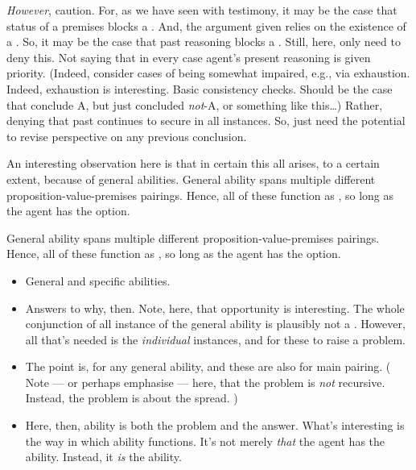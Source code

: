 \begin{note}
  \emph{However}, caution.
  For, as we have seen with testimony, it may be the case that status of a premises blocks a \requ{}.
  And, the argument given relies on the existence of a \requ{}.
  So, it may be the case that past reasoning blocks a \requ{}.
  Still, here, only need to deny this.
  Not saying that in every case agent's present reasoning is given priority.
  (Indeed, consider cases of being somewhat impaired, e.g., via exhaustion.
  Indeed, exhaustion is interesting.
  Basic consistency checks.
  Should be the case that conclude A, but just concluded \emph{not}-A, or something like this\dots)
  Rather, denying that past continues to secure in all instances.
  So, just need the potential to revise perspective on any previous conclusion.
\end{note}

\begin{note}
  An interesting observation here is that in certain this all arises, to a certain extent, because of general abilities.
  General ability spans multiple different proposition-value-premises pairings.
  Hence, all of these function as , so long as the agent has the option.

  General ability spans multiple different proposition-value-premises pairings.
  Hence, all of these function as , so long as the agent has the option.

  \begin{itemize}
  \item
    General and specific abilities.
  \item
    Answers to why, then.
    Note, here, that opportunity is interesting.
    The whole conjunction of all instance of the general ability is plausibly not a \requ{}.
    However, all that's needed is the \emph{individual} instances, and for these to raise a problem.
  \item
    The point is,  for any general ability, and these are also  for main pairing.
    (%
    Note --- or perhaps emphasise --- here, that the problem is \emph{not} recursive.
    Instead, the problem is about the spread.%
    )
  \item
    Here, then, ability is both the problem and the answer.
    What's interesting is the way in which ability functions.
    It's not merely \emph{that} the agent has the ability.
    Instead, it \emph{is} the ability.
  \end{itemize}
\end{note}

